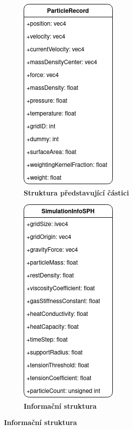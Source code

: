 \newpage

\begin{figure}[h]
	\centering
	\captionsetup{justification=centering}
	\begin{subfigure}[t]{.5\textwidth}
			\centering
        	\includegraphics[scale=0.6]{obrazky-figures/ParticleRecord.png}
        	\caption{\textbf{Struktura představující částici}}
        	\label{fig:ParticleRecord}
	\end{subfigure}%
	\begin{subfigure}[t]{.5\textwidth}
		\centering
		\includegraphics[scale=0.6]{obrazky-figures/SimulationInfoSPH.png}
		\caption{\textbf{Informační struktura}}
		\label{fig:SimInfoSPH}
	\end{subfigure}

\end{figure}
